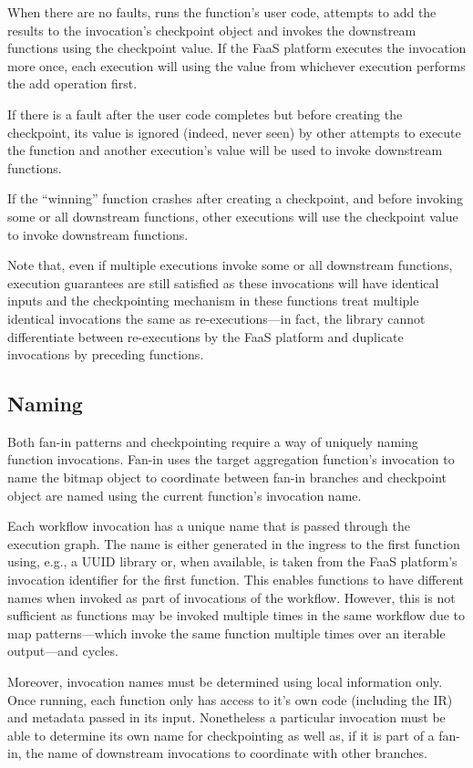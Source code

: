 When there are no faults, \name{} runs the function's user code, attempts to add
the results to the invocation's checkpoint object and invokes the downstream
functions using the checkpoint value. If the FaaS platform executes the
invocation more once, each execution will using the value from whichever
execution performs the add operation first.

If there is a fault after the user code completes but before creating the
checkpoint, its value is ignored (indeed, never seen) by other attempts to
execute the function and another execution's value will be used to invoke
downstream functions.

If the ``winning'' function crashes after creating a checkpoint, and before
invoking some or all downstream functions, other executions will use the
checkpoint value to invoke downstream functions.

Note that, even if multiple executions invoke some or all downstream functions,
execution guarantees are still satisfied as these invocations will have
identical inputs and the checkpointing mechanism in these functions treat
multiple identical invocations the same as re-executions---in fact, the \name{}
library cannot differentiate between re-executions by the FaaS platform and
duplicate invocations by preceding functions.

\subsection{Naming}\label{sec:design:naming}

Both fan-in patterns and checkpointing require a way of uniquely naming function
invocations. Fan-in uses the target aggregation function's invocation to name
the bitmap object to coordinate between fan-in branches and checkpoint object
are named using the current function's invocation name.

Each workflow invocation has a unique name that is passed through the execution
graph. The name is either generated in the ingress to the first function using,
e.g., a UUID library or, when available, is taken from the FaaS platform's
invocation identifier for the first function. This enables functions to have
different names when invoked as part of invocations of the workflow. However,
this is not sufficient as functions may be invoked multiple times in the same
workflow due to map patterns---which invoke the same function multiple times over
an iterable output---and cycles.

Moreover, invocation names must be determined using local information only. Once
running, each function only has access to it's own code (including the IR) and
metadata passed in its input. Nonetheless a particular invocation must be able
to determine its own name for checkpointing as well as, if it is part of a
fan-in, the name of downstream invocations to coordinate with other branches.

